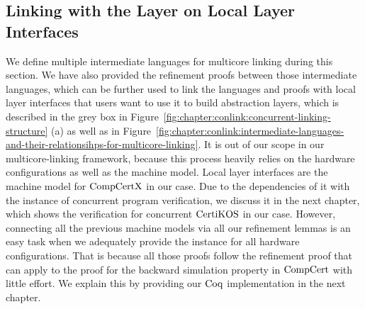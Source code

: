 
\subsection{Linking with the Layer on Local Layer Interfaces}
\label{chapter:linking:subsec:linking-with-the-layer-on-local-layer-interface}


We define multiple intermediate languages for multicore linking during this section.
We have also provided the refinement proofs between those intermediate languages, which can be further used to link the languages and proofs with  local layer interfaces that users want to use 
it to build abstraction layers, which is described in the grey box in Figure~\ref{fig:chapter:conlink:concurrent-linking-structure} (a) as well as in Figure~\ref{fig:chapter:conlink:intermediate-languages-and-their-relationsihps-for-multicore-linking}.
It is out of our scope in our multicore-linking framework,
because this process heavily relies on the hardware configurations as well as the machine model.
Local layer interfaces are the machine model for $\mathrm{CompCertX}$ in our case. 
Due to the dependencies of it with the instance of concurrent program verification, 
we discuss it in the next chapter, which shows the verification for concurrent $\mathrm{CertiKOS}$ in our case. 
However, connecting all the previous machine models via
all our refinement lemmas is an
easy task when we adequately provide the instance for all hardware configurations.
That is because all those proofs follow the refinement proof that can apply to the proof for the backward simulation property in $\mathrm{CompCert}$ with little effort. 
We explain this by providing our $\mathrm{Coq}$ implementation in the next chapter.
